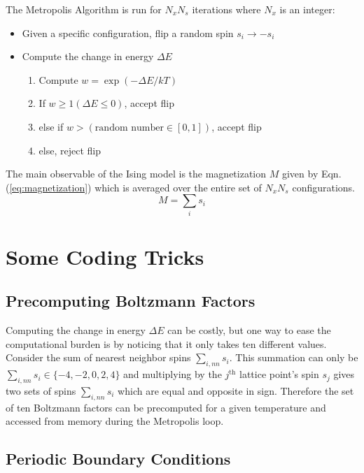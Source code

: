 \documentclass[12pt,oneside,a4paper]{article}
\begin{document}
The Metropolis Algorithm is run for $N_xN_s$ iterations where $N_x$ is an integer:
\begin{itemize}
\item Given a specific configuration, flip a random spin $s_i\rightarrow -s_i$
\item Compute the change in energy $\Delta E$
	\begin{enumerate}
		\item Compute $w = \exp\left(-\Delta E / kT\right)$
		\item If $w \geq 1 (\Delta E \leq 0)$, accept flip
		\item else if $w > \left(\text{random number} \in \left[0,1\right]\right)$, accept flip
		\item else, reject flip
	\end{enumerate}
\end{itemize}
The main observable of the Ising model is the magnetization $M$ given by Eqn. (\ref{eq:magnetization}) which is averaged over the entire set of $N_x N_s$ configurations.
\begin{equation}
M = \sum\limits_i s_i
\label{eq:magnetization}
\end{equation}

\section{Some Coding Tricks}

\subsection{Precomputing Boltzmann Factors}



Computing the change in energy $\Delta E$ can be costly, but one way to ease the computational burden is by noticing that it only takes ten different values.  Consider the sum of nearest neighbor spins $\sum\limits_{i,nn}s_i$.  This summation can only be $\sum\limits_{i,nn}s_i \in \lbrace-4, -2, 0, 2, 4\rbrace$ and multiplying by the $j^\text{th}$ lattice point's spin $s_j$ gives two sets of spins $\sum\limits_{i,nn}s_i$ which are equal and opposite in sign.  Therefore the set of ten Boltzmann factors can be precomputed for a given temperature and accessed from memory during the Metropolis loop.

\subsection{Periodic Boundary Conditions}
\end{document}
